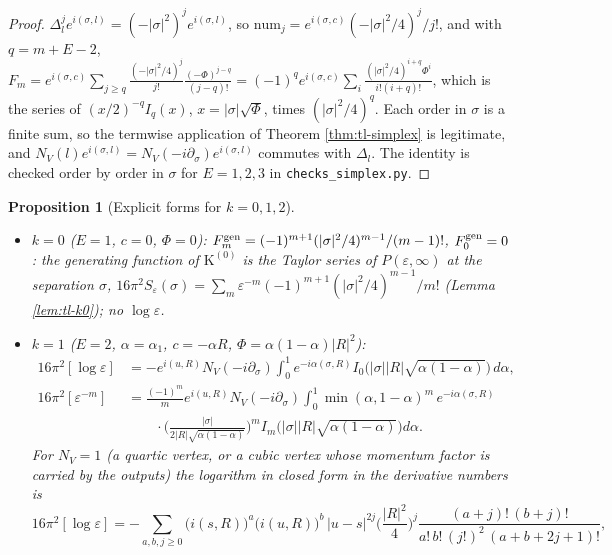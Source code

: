\documentclass[11pt]{article}
\numberwithin{equation}{section}
\theoremstyle{plain}
\newtheorem{proposition}[theorem]{Proposition}
\theoremstyle{definition}
\begin{document}
\begin{proof}
$\Delta_l^je^{i(\sigma,l)}=(-|\sigma|^2)^je^{i(\sigma,l)}$, so $\mathrm{num}_j=e^{i(\sigma,c)}(-|\sigma|^2/4)^j/j!$, and with $q=m+E-2$, $F_m=e^{i(\sigma,c)}\sum_{j\ge q}\frac{(-|\sigma|^2/4)^j}{j!}\frac{(-\Phi)^{j-q}}{(j-q)!}=(-1)^qe^{i(\sigma,c)}\sum_i\frac{(|\sigma|^2/4)^{i+q}\Phi^i}{i!(i+q)!}$, which is the series of $(x/2)^{-q}I_q(x)$, $x=|\sigma|\sqrt\Phi$, times $(|\sigma|^2/4)^q$. Each order in $\sigma$ is a finite sum, so the termwise application of Theorem \ref{thm:tl-simplex} is legitimate, and $N_V(l)e^{i(\sigma,l)}=N_V(-i\partial_\sigma)e^{i(\sigma,l)}$ commutes with $\Delta_l$. The identity is checked order by order in $\sigma$ for $E=1,2,3$ in \texttt{checks\_simplex.py}.
\end{proof}

\begin{proposition}[Explicit forms for $k=0,1,2$]
\label{prop:tl-bubble}
\begin{itemize}
\item $k=0$ ($E=1$, $c=0$, $\Phi=0$): $F_m^{\rm gen}=(-1)^{m+1}(|\sigma|^2/4)^{m-1}/(m-1)!$, $F_0^{\rm gen}=0$: the generating function of $\mathrm K^{(0)}$ is the Taylor series of $P(\varepsilon,\infty)$ at the separation $\sigma$, $16\pi^2S_\varepsilon(\sigma)=\sum_m\varepsilon^{-m}(-1)^{m+1}(|\sigma|^2/4)^{m-1}/m!$ (Lemma \ref{lem:tl-k0}); no $\log\varepsilon$.
\item $k=1$ ($E=2$, $\alpha=\alpha_1$, $c=-\alpha R$, $\Phi=\alpha(1-\alpha)|R|^2$):
\[
\begin{aligned}
16\pi^2[\log\varepsilon]&=-e^{i(u,R)}N_V(-i\partial_\sigma)\int_0^1e^{-i\alpha(\sigma,R)}I_0\big(|\sigma||R|\sqrt{\alpha(1-\alpha)}\big)\,d\alpha,\\
16\pi^2[\varepsilon^{-m}]&=\frac{(-1)^m}me^{i(u,R)}N_V(-i\partial_\sigma)\int_0^1\min(\alpha,1-\alpha)^m\,e^{-i\alpha(\sigma,R)}\\ &\qquad\cdot\Big(\frac{|\sigma|}{2|R|\sqrt{\alpha(1-\alpha)}}\Big)^mI_m\big(|\sigma||R|\sqrt{\alpha(1-\alpha)}\big)d\alpha .
\end{aligned}
\]
For $N_V=1$ (a quartic vertex, or a cubic vertex whose momentum factor is carried by the outputs) the logarithm in closed form in the derivative numbers is
\begin{equation}
16\pi^2[\log\varepsilon]=-\sum_{a,b,j\ge0}\big(i(s,R)\big)^a\big(i(u,R)\big)^b\,|u-s|^{2j}\Big(\frac{|R|^2}4\Big)^j\frac{(a+j)!\,(b+j)!}{a!\,b!\,(j!)^2\,(a+b+2j+1)!},
\label{eq:tl-bubbleclosed}
\end{equation}

\end{itemize}
\end{proposition}
\end{document}
